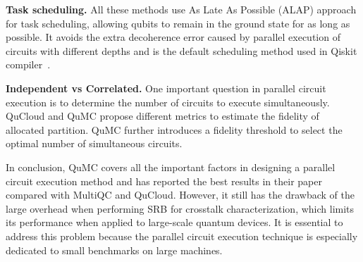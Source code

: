 \documentclass[conference]{IEEEtran}
\begin{document}
\textbf{Task scheduling.} All these methods use As Late As Possible (ALAP) approach for task scheduling, allowing qubits to remain in the ground state for as long as possible. It avoids the extra decoherence error caused by parallel execution of circuits with different depths and is the default scheduling method used in Qiskit compiler~\cite{Qiskit-Textbook}. 

\textbf{Independent vs Correlated.} One important question in parallel circuit execution is to determine the number of circuits to execute simultaneously. QuCloud and QuMC propose different metrics to estimate the fidelity of allocated partition. QuMC further introduces a fidelity threshold to select the optimal number of simultaneous circuits.  

In conclusion, QuMC covers all the important factors in designing a parallel circuit execution method and has reported the best results in their paper compared with MultiQC and QuCloud. However, it still has the drawback of the large overhead when performing SRB for crosstalk characterization, which limits its performance when applied to large-scale quantum devices. It is essential to address this problem because the parallel circuit execution technique is especially dedicated to small benchmarks on large machines. 

\textbf{}

%
\end{document}

